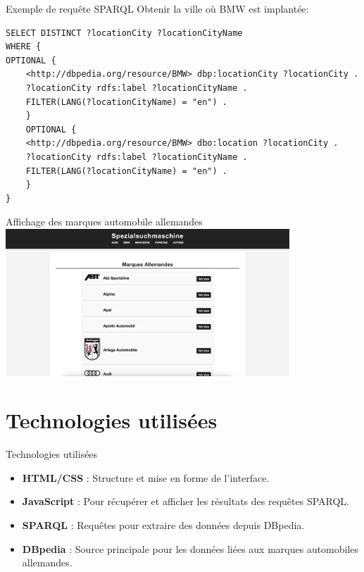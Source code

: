 \documentclass[10pt]{beamer}
\begin{document}
\begin{frame}[fragile]{Exemple de requête SPARQL}
Obtenir la ville où BMW est implantée:
{\footnotesize
\begin{verbatim}
SELECT DISTINCT ?locationCity ?locationCityName
WHERE {
OPTIONAL {
    <http://dbpedia.org/resource/BMW> dbp:locationCity ?locationCity .
    ?locationCity rdfs:label ?locationCityName .
    FILTER(LANG(?locationCityName) = "en") .
    }
    OPTIONAL {
    <http://dbpedia.org/resource/BMW> dbo:location ?locationCity .
    ?locationCity rdfs:label ?locationCityName .
    FILTER(LANG(?locationCityName) = "en") .
    }
}
\end{verbatim}
}
\end{frame}

\begin{frame}{Affichage des marques automobile allemandes}
\centering
\includegraphics[width=0.8\textwidth]{images/marques.png}
\end{frame}

\section{Technologies utilisées}
\begin{frame}{Technologies utilisées}
\begin{itemize}
    \item \textbf{HTML/CSS} : Structure et mise en forme de l'interface.  
    \item \textbf{JavaScript} : Pour récupérer et afficher les résultats des requêtes SPARQL.  
    \item \textbf{SPARQL} : Requêtes pour extraire des données depuis DBpedia.  
    \item \textbf{DBpedia} : Source principale pour les données liées aux marques automobiles allemandes.  
\end{itemize}
\end{frame}
\end{document}
